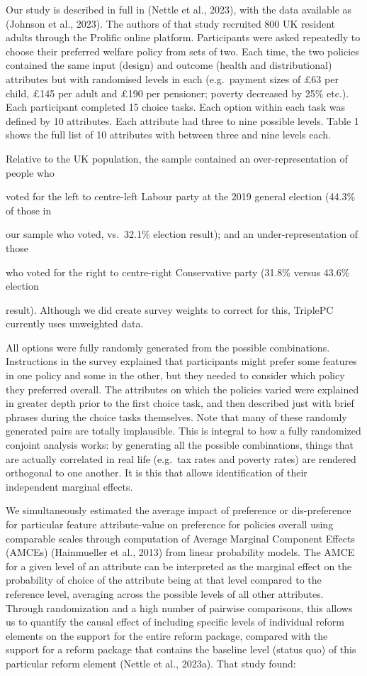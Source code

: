 \documentclass[
  letterpaper,
  DIV=11,
  numbers=noendperiod]{scrartcl}
\begin{document}
Our study is described in full in (Nettle et al., 2023), with the data
available as (Johnson et al., 2023). The authors of that study recruited
800 UK resident adults through the Prolific online platform.
Participants were asked repeatedly to choose their preferred welfare
policy from sets of two. Each time, the two policies contained the same
input (design) and outcome (health and distributional) attributes but
with randomised levels in each (e.g.~payment sizes of £63 per child,
£145 per adult and £190 per pensioner; poverty decreased by 25\% etc.).
Each participant completed 15 choice tasks. Each option within each task
was defined by 10 attributes. Each attribute had three to nine possible
levels. Table 1 shows the full list of 10 attributes with between three
and nine levels each.

Relative to the UK population, the sample contained an
over-representation of people who

voted for the left to centre-left Labour party at the 2019 general
election (44.3\% of those in

our sample who voted, vs.~32.1\% election result); and an
under-representation of those

who voted for the right to centre-right Conservative party (31.8\%
versus 43.6\% election

result). Although we did create survey weights to correct for this,
TriplePC currently uses unweighted data.

All options were fully randomly generated from the possible
combinations. Instructions in the survey explained that participants
might prefer some features in one policy and some in the other, but they
needed to consider which policy they preferred overall. The attributes
on which the policies varied were explained in greater depth prior to
the first choice task, and then described just with brief phrases during
the choice tasks themselves. Note that many of these randomly generated
pairs are totally implausible. This is integral to how a fully
randomized conjoint analysis works: by generating all the possible
combinations, things that are actually correlated in real life (e.g.~tax
rates and poverty rates) are rendered orthogonal to one another. It is
this that allows identification of their independent marginal effects.

We simultaneously estimated the average impact of preference or
dis-preference for particular feature attribute-value on preference for
policies overall using comparable scales through computation of Average
Marginal Component Effects (AMCEs) (Hainmueller et al., 2013) from
linear probability models. The AMCE for a given level of an attribute
can be interpreted as the marginal effect on the probability of choice
of the attribute being at that level compared to the reference level,
averaging across the possible levels of all other attributes. Through
randomization and a high number of pairwise comparisons, this allows us
to quantify the causal effect of including specific levels of individual
reform elements on the support for the entire reform package, compared
with the support for a reform package that contains the baseline level
(status quo) of this particular reform element (Nettle et al., 2023a).
That study found:
\end{document}
